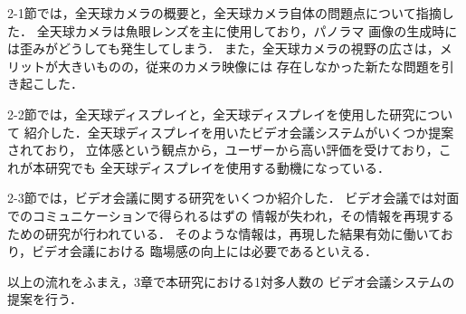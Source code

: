 2-1節では，全天球カメラの概要と，全天球カメラ自体の問題点について指摘した．
全天球カメラは魚眼レンズを主に使用しており，パノラマ
画像の生成時には歪みがどうしても発生してしまう．
また，全天球カメラの視野の広さは，メリットが大きいものの，従来のカメラ映像には
存在しなかった新たな問題を引き起こした．

2-2節では，全天球ディスプレイと，全天球ディスプレイを使用した研究について
紹介した．全天球ディスプレイを用いたビデオ会議システムがいくつか提案されており，
立体感という観点から，ユーザーから高い評価を受けており，これが本研究でも
全天球ディスプレイを使用する動機になっている．

2-3節では，ビデオ会議に関する研究をいくつか紹介した．
ビデオ会議では対面でのコミュニケーションで得られるはずの
情報が失われ，その情報を再現するための研究が行われている．
そのような情報は，再現した結果有効に働いており，ビデオ会議における
臨場感の向上には必要であるといえる．

以上の流れをふまえ，3章で本研究における1対多人数の
ビデオ会議システムの提案を行う．